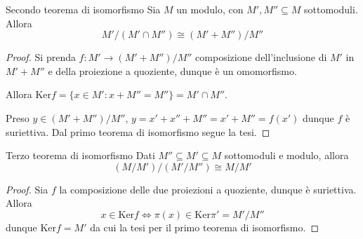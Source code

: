 \begin{theorem}{Secondo teorema di isomorfismo}
    Sia \(M\) un modulo, con \(M', M'' \subseteq M \) sottomoduli. Allora 
    \[
      M' / (M' \cap  M'') \cong {(M' + M'')} / M''
    \]
\end{theorem}
\begin{proof}{}
    Si prenda \(f : M' \to (M' + M'') / M''\) composizione dell'inclusione di \(M'\) in \(M' + M''\) e della proiezione a quoziente, dunque è un omomorfismo.

    Allora \(\mathrm{Ker} f = \{x \in M' : x + M'' = M''\} = M' \cap  M'' \).

    Preso \(y \in {(M' + M'')}/M''\), \(y = x' + x'' + M''
     = x' + M'' = f{(x')}\) dunque \(f\) è suriettiva. Dal primo
     teorema di isomorfismo segue la tesi.
\end{proof}


\begin{theorem}{Terzo teorema di isomorfismo}
    Dati \(M'' \subseteq M' \subseteq M\)  sottomoduli e modulo, allora
    \[
      {({M}/{M'})} / {(M'/ M'')} \cong M / M'
    \]
\end{theorem}
\begin{proof}{}
    Sia \(f\) la composizione delle due proiezioni a quoziente, dunque è
    suriettiva. Allora
    \[
      x \in \mathrm{Ker}f \iff \pi{(x)} \in \mathrm{Ker}\pi' = M'/M''
    \]
    dunque \(\mathrm{Ker}f  = M'\) da cui la tesi per il primo teorema di
    isomorfismo.
\end{proof}

